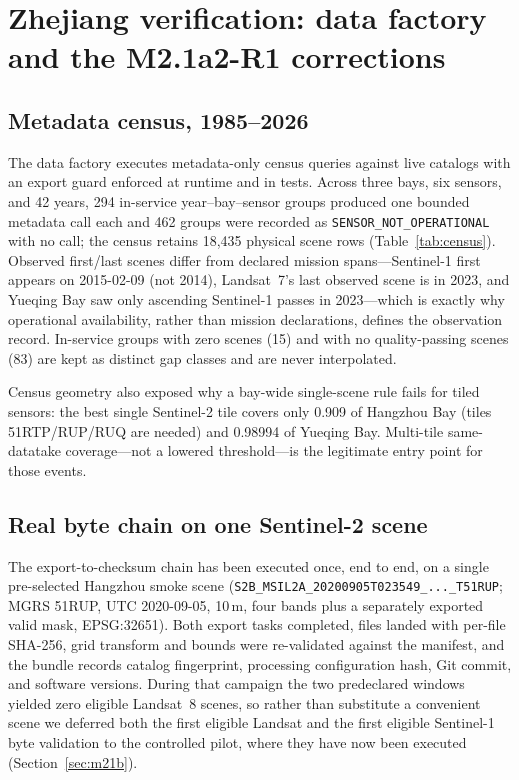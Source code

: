 \section{Zhejiang verification: data factory and the M2.1a2-R1 corrections}\label{sec:zhejiang}

\subsection{Metadata census, 1985--2026}
The data factory executes metadata-only census queries against live
catalogs with an export guard enforced at runtime and in tests. Across
three bays, six sensors, and 42 years, 294 in-service year--bay--sensor
groups produced one bounded metadata call each and 462 groups were
recorded as \texttt{SENSOR\_NOT\_OPERATIONAL} with no call; the census
retains 18{,}435 physical scene rows (Table~\ref{tab:census}). Observed
first/last scenes differ from declared mission spans---Sentinel-1 first
appears on 2015-02-09 (not 2014), Landsat~7's last observed scene is in
2023, and Yueqing Bay saw only ascending Sentinel-1 passes in
2023---which is exactly why operational availability, rather than
mission declarations, defines the observation record. In-service groups
with zero scenes (15) and with no quality-passing scenes (83) are kept
as distinct gap classes and are never interpolated.



\begin{figure}[t]\centering
{}
\label{fig:timeline}
\end{figure}

Census geometry also exposed why a bay-wide single-scene rule fails for
tiled sensors: the best single Sentinel-2 tile covers only 0.909 of
Hangzhou Bay (tiles 51RTP/RUP/RUQ are needed) and 0.98994 of Yueqing
Bay. Multi-tile same-datatake coverage---not a lowered
threshold---is the legitimate entry point for those events.

\subsection{Real byte chain on one Sentinel-2 scene}
The export-to-checksum chain has been executed once, end to end, on a
single pre-selected Hangzhou smoke scene
(\texttt{S2B\_MSIL2A\_20200905T023549\_...\_T51RUP}; MGRS 51RUP, UTC
2020-09-05, 10\,m, four bands plus a separately exported valid mask,
EPSG:32651). Both export tasks completed, files landed with
per-file SHA-256, grid transform and bounds were re-validated against
the manifest, and the bundle records catalog fingerprint, processing
configuration hash, Git commit, and software versions. During that campaign the two predeclared windows yielded zero
eligible Landsat~8 scenes, so rather than substitute a convenient
scene we deferred both the first eligible Landsat and the first
eligible Sentinel-1 byte validation to the controlled pilot, where
they have now been executed (Section~\ref{sec:m21b}).

